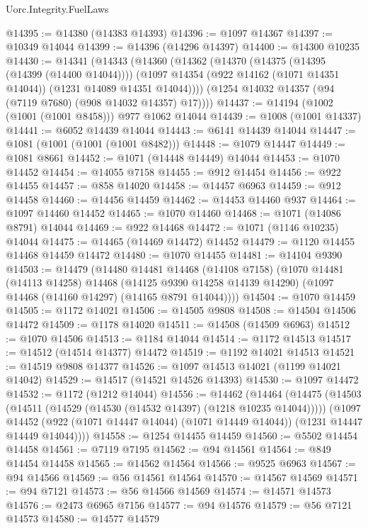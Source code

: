 \begin{lexlean}{Uorc.Integrity.FuelLaws}
\begin{coremodule}
@14395 := @14380 (@14383 @14393)
@14396 := @1097 @14367
@14397 := @10349 @14044
@14399 := @14396 (@14296 @14397)
@14400 := @14300 @10235
@14430 := @14341
    (@14343
      (@14360
        (@14362
          (@14370
            (@14375 (@14395 (@14399 (@14400 @14044))))
            (@1097 @14354 (@922 @14162 (@1071 @14351 @14044)) (@1231 @14089 @14351 @14044))))
        (@1254 @14032 @14357 (@94 (@7119 @7680) (@908 @14032 @14357) @17))))
@14437 := @14194 (@1002 (@1001 (@1001 @8458))) @977 @1062 @14044
@14439 := @1008 (@1001 @14337)
@14441 := @6052 @14439 @14044
@14443 := @6141 @14439 @14044
@14447 := @1081 (@1001 (@1001 (@1001 @8482)))
@14448 := @1079 @14447
@14449 := @1081 @8661
@14452 := @1071 (@14448 @14449) @14044
@14453 := @1070 @14452
@14454 := @14055 @7158
@14455 := @912 @14454
@14456 := @922 @14455
@14457 := @858 @14020
@14458 := @14457 @6963
@14459 := @912 @14458
@14460 := @14456 @14459
@14462 := @14453 @14460 @937
@14464 := @1097 @14460 @14452
@14465 := @1070 @14460
@14468 := @1071 (@14086 @8791) @14044
@14469 := @922 @14468
@14472 := @1071 (@1146 @10235) @14044
@14475 := @14465 (@14469 @14472) @14452
@14479 := @1120 @14455 @14468 @14459 @14472
@14480 := @1070 @14455
@14481 := @14104 @9390
@14503 := @14479
    (@14480
      @14481
      @14468
      (@14108 @7158)
      (@1070
        @14481
        (@14113 @14258)
        @14468
        (@14125 @9390 @14258 @14139 @14290)
        (@1097 @14468 (@14160 @14297) (@14165 @8791 @14044))))
@14504 := @1070 @14459
@14505 := @1172 @14021
@14506 := @14505 @9808
@14508 := @14504 @14506 @14472
@14509 := @1178 @14020
@14511 := @14508 (@14509 @6963)
@14512 := @1070 @14506
@14513 := @1184 @14044
@14514 := @1172 @14513
@14517 := @14512 (@14514 @14377) @14472
@14519 := @1192 @14021 @14513
@14521 := @14519 @9808 @14377
@14526 := @1097 @14513 @14021 (@1199 @14021 @14042)
@14529 := @14517 (@14521 @14526 @14393)
@14530 := @1097 @14472
@14532 := @1172 (@1212 @14044)
@14556 := @14462
    (@14464
      (@14475
        (@14503 (@14511 (@14529 (@14530 (@14532 @14397) (@1218 @10235 @14044)))))
        (@1097
          @14452
          (@922 (@1071 @14447 @14044) (@1071 @14449 @14044))
          (@1231 @14447 @14449 @14044))))
@14558 := @1254 @14455 @14459
@14560 := @5502 @14454 @14458
@14561 := @7119 @7195
@14562 := @94 @14561
@14564 := @849 @14454 @14458
@14565 := @14562 @14564
@14566 := @9525 @6963
@14567 := @94 @14566
@14569 := @56 @14561 @14564
@14570 := @14567 @14569
@14571 := @94 @7121
@14573 := @56 @14566 @14569
@14574 := @14571 @14573
@14576 := @2473 @6965 @7156
@14577 := @94 @14576
@14579 := @56 @7121 @14573
@14580 := @14577 @14579

\end{coremodule}
\end{lexlean}
